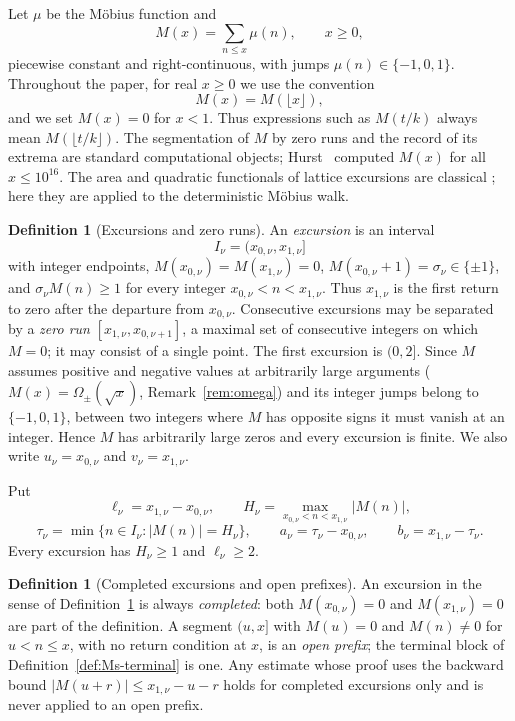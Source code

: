 \documentclass[11pt]{amsart}
\numberwithin{equation}{section}
\theoremstyle{plain}
\theoremstyle{definition}
\newtheorem{definition}[theorem]{Definition}
\theoremstyle{remark}
\begin{document}
Let $\mu$ be the M\"obius function and
\begin{equation}
\label{eq:mertens_def}
M(x)=\sum_{n\le x}\mu(n),\qquad x\ge0,
\end{equation}
piecewise constant and right-continuous, with jumps $\mu(n)\in\{-1,0,1\}$.
Throughout the paper, for real $x\ge0$ we use the convention
\[
M(x)=M(\lfloor x\rfloor),
\]
and we set $M(x)=0$ for $x<1$. Thus expressions such as $M(t/k)$ always
mean $M(\lfloor t/k\rfloor)$. The segmentation of $M$ by zero runs and the record of its
extrema are standard computational objects; Hurst~\cite{Hurst18} computed
$M(x)$ for all $x\le10^{16}$. The area and quadratic functionals of lattice
excursions are classical
\cite{Takacs91,NguyenThe04,Richard05,Janson07,DKW15,CP17}; here they are
applied to the deterministic M\"obius walk.

\begin{definition}[Excursions and zero runs]
\label{def:excursion}
An \emph{excursion} is an interval
\[
I_\nu=(x_{0,\nu},x_{1,\nu}]
\]
with integer endpoints, $M(x_{0,\nu})=M(x_{1,\nu})=0$,
$M(x_{0,\nu}+1)=\sigma_\nu\in\{\pm1\}$, and
$\sigma_\nu M(n)\ge1$ for every integer $x_{0,\nu}<n<x_{1,\nu}$. Thus
$x_{1,\nu}$ is the first return to zero after the departure from
$x_{0,\nu}$. Consecutive excursions may be separated by a \emph{zero run}
$[x_{1,\nu},x_{0,\nu+1}]$, a maximal set of consecutive integers on which
$M=0$; it may consist of a single point. The first excursion is $(0,2]$.
Since $M$ assumes positive and negative values at arbitrarily large
arguments ($M(x)=\Omega_\pm(\sqrt x)$, Remark~\ref{rem:omega}) and its
integer jumps belong to $\{-1,0,1\}$, between two integers where $M$ has
opposite signs it must vanish at an integer.  Hence $M$ has arbitrarily large zeros and every
excursion is finite. We also write $u_\nu=x_{0,\nu}$ and
$v_\nu=x_{1,\nu}$.

Put
\[
\ell_\nu=x_{1,\nu}-x_{0,\nu},\qquad
H_\nu=\max_{x_{0,\nu}<n<x_{1,\nu}}|M(n)|,
\]
\[
\tau_\nu=\min\{n\in I_\nu:|M(n)|=H_\nu\},\qquad
a_\nu=\tau_\nu-x_{0,\nu},\qquad b_\nu=x_{1,\nu}-\tau_\nu.
\]
Every excursion has $H_\nu\ge1$ and $\ell_\nu\ge2$.
\end{definition}

\begin{definition}[Completed excursions and open prefixes]
\label{def:completed-open}
An excursion in the sense of Definition~\ref{def:excursion} is always
\emph{completed}: both $M(x_{0,\nu})=0$ and $M(x_{1,\nu})=0$ are part of
the definition. A segment $(u,x]$ with $M(u)=0$ and $M(n)\ne0$ for
$u<n\le x$, with no return condition at $x$, is an \emph{open prefix}; the
terminal block of Definition~\ref{def:Ms-terminal} is one. Any estimate
whose proof uses the backward bound $|M(u+r)|\le x_{1,\nu}-u-r$ holds for
completed excursions only and is never applied to an open prefix.
\end{definition}
\end{document}
